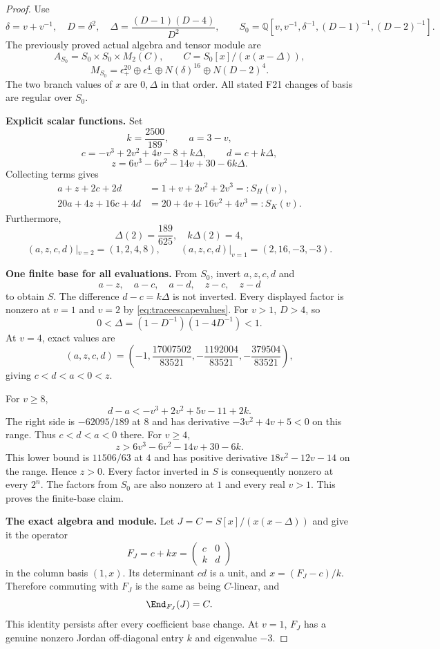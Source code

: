 \begin{proof}
Use
\[
 \delta=v+v^{-1},\quad D=\delta^2,\quad
 \Delta=\frac{(D-1)(D-4)}{D^2},\qquad
 S_0=\mathbb Q[v,v^{-1},\delta^{-1},(D-1)^{-1},(D-2)^{-1}].
\]
The previously proved actual algebra and tensor module are
\[
 A_{S_0}=S_0\times S_0\times M_2(C),\qquad
 C=S_0[x]/(x(x-\Delta)),
\]
\[
 M_{S_0}=\epsilon_+^{20}\oplus\epsilon_-^4
       \oplus N(\delta)^{16}\oplus N(D-2)^4.
\]
The two branch values of $x$ are $0,\Delta$ in that order.
All stated F21 changes of basis are regular over $S_0$.

\par\smallskip\noindent\textbf{Explicit scalar functions.}\quad
Set
\[
 k=\frac{2500}{189},\qquad a=3-v,
\]
\[
 c=-v^3+2v^2+4v-8+k\Delta,\qquad d=c+k\Delta,
\]
\[
 z=6v^3-6v^2-14v+30-6k\Delta.
\]
Collecting terms gives
\begin{align}
 a+z+2c+2d&=1+v+2v^2+2v^3=:S_H(v),
       \label{eq:traceescapeH}\\
 20a+4z+16c+4d&=20+4v+16v^2+4v^3=:S_K(v).
       \label{eq:traceescapeK}
\end{align}
Furthermore,
\[
 \Delta(2)=\frac{189}{625},\quad k\Delta(2)=4,
\]
\begin{equation}\label{eq:traceescapevalues}
 (a,z,c,d)|_{v=2}=(1,2,4,8),\qquad
 (a,z,c,d)|_{v=1}=(2,16,-3,-3).
\end{equation}

\par\smallskip\noindent\textbf{One finite base for all evaluations.}\quad
From $S_0$, invert $a,z,c,d$ and
\[
 a-z,\quad a-c,\quad a-d,\quad z-c,\quad z-d
\]
to obtain $S$.
The difference $d-c=k\Delta$ is not inverted.
Every displayed factor is nonzero at $v=1$ and $v=2$
by \eqref{eq:traceescapevalues}.
For $v>1$, $D>4$, so
\[
 0<\Delta=(1-D^{-1})(1-4D^{-1})<1.
\]
At $v=4$, exact values are
\[
 (a,z,c,d)=
 \left(-1,\frac{17007502}{83521},
       -\frac{1192004}{83521},-\frac{379504}{83521}\right),
\]
giving $c<d<a<0<z$.

For $v\ge8$,
\[
 d-a<-v^3+2v^2+5v-11+2k.
\]
The right side is $-62095/189$ at $8$ and has derivative
$-3v^2+4v+5<0$ on this range.
Thus $c<d<a<0$ there.
For $v\ge4$,
\[
 z>6v^3-6v^2-14v+30-6k.
\]
This lower bound is $11506/63$ at $4$ and has positive
derivative $18v^2-12v-14$ on the range.
Hence $z>0$.
Every factor inverted in $S$ is consequently nonzero
at every $2^n$.
The factors from $S_0$ are also nonzero at $1$ and
every real $v>1$. This proves the finite-base claim.

\par\smallskip\noindent\textbf{The exact algebra and module.}\quad
Let $J=C=S[x]/(x(x-\Delta))$ and give it the operator
\[
 F_J=c+kx
     =\begin{pmatrix}c&0\\ k&d\end{pmatrix}
\]
in the column basis $(1,x)$.
Its determinant $cd$ is a unit, and
$x=(F_J-c)/k$.
Therefore commuting with $F_J$ is the same as being
$C$-linear, and
\[
 \End_{F_J}(J)=C.
\]
This identity persists after every coefficient base change.
At $v=1$, $F_J$ has a genuine nonzero Jordan off-diagonal
entry $k$ and eigenvalue $-3$.


\end{proof}

